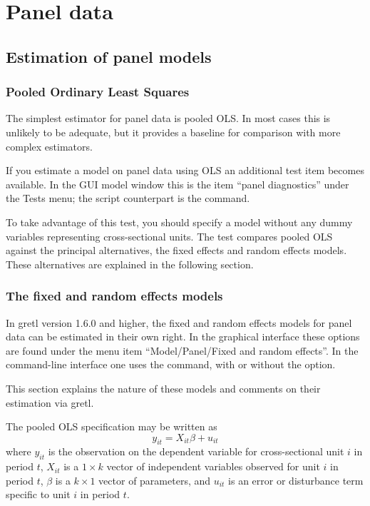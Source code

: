 \chapter{Panel data}
\label{chap-panel}

\section{Estimation of panel models}

\subsection{Pooled Ordinary Least Squares}
\label{pooled-est}

The simplest estimator for panel data is pooled OLS.  In most cases
this is unlikely to be adequate, but it provides a baseline for
comparison with more complex estimators.

If you estimate a model on panel data using OLS an additional test
item becomes available.  In the GUI model window this is the item
``panel diagnostics'' under the \textsf{Tests} menu; the script
counterpart is the  command.

To take advantage of this test, you should specify a model without any
dummy variables representing cross-sectional units.  The test compares
pooled OLS against the principal alternatives, the fixed effects and
random effects models.  These alternatives are explained in the
following section.

\subsection{The fixed and random effects models}
\label{panel-est}

In gretl version 1.6.0 and higher, the fixed and random effects
models for panel data can be estimated in their own right.  In the
graphical interface these options are found under the menu item
``Model/Panel/Fixed and random effects''.  In the command-line
interface one uses the  command, with or without the
 option.

This section explains the nature of these models and comments on their
estimation via gretl.

The pooled OLS specification may be written as 
\begin{equation}
\label{eq:pooled}
y_{it} = X_{it}\beta + u_{it}
\end{equation}
where $y_{it}$ is the observation on the dependent variable for
cross-sectional unit $i$ in period $t$, $X_{it}$ is a $1\times k$
vector of independent variables observed for unit $i$ in period $t$,
$\beta$ is a $k\times 1$ vector of parameters, and $u_{it}$ is an error
or disturbance term specific to unit $i$ in period $t$.

